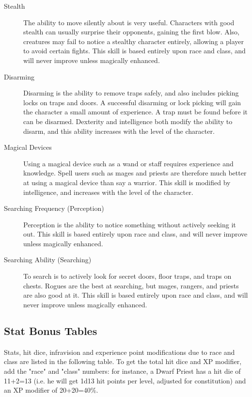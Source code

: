 \begin{description}
\item[Stealth]
  The ability to move silently about is very useful. Characters
  with good stealth can usually surprise their opponents,
  gaining the first blow. Also, creatures may fail to notice
  a stealthy character entirely, allowing a player to avoid
  certain fights. This skill is based entirely upon race and
  class, and will never improve unless magically enhanced.
 
\item[Disarming]
  Disarming is the ability to remove traps safely, and also
  includes picking locks on traps and doors. A successful
  disarming or lock picking will gain the character a small
  amount of experience. A trap must be found before it can
  be disarmed. Dexterity and intelligence both modify the
  ability to disarm, and this ability increases with the
  level of the character.
 
\item[Magical Devices]
  Using a magical device such as a wand or staff requires
  experience and knowledge. Spell users such as mages and
  priests are therefore much better at using a magical device
  than say a warrior. This skill is modified by intelligence,
  and increases with the level of the character.

\item[Searching Frequency (Perception)]
  Perception is the ability to notice something without
  actively seeking it out. This skill is based entirely upon
  race and class, and will never improve unless magically
  enhanced.

\item[Searching Ability (Searching)]
  To search is to actively look for secret doors, floor traps,
  and traps on chests. Rogues are the best at searching, but
  mages, rangers, and priests are also good at it. This skill
  is based entirely upon race and class, and will never
  improve unless magically enhanced.
\end{description}

 
\subsection{Stat Bonus Tables}
\paragraph{}
Stats, hit dice, infravision and experience point modifications due to
race and class are listed in the following table. To get the total hit
dice and XP modifier, add the "race" and "class" numbers: for instance,
a Dwarf Priest has a hit die of 11+2=13 (i.e. he will get 1d13 hit
points per level, adjusted for constitution) and an XP modifier of
20+20=40\%.

